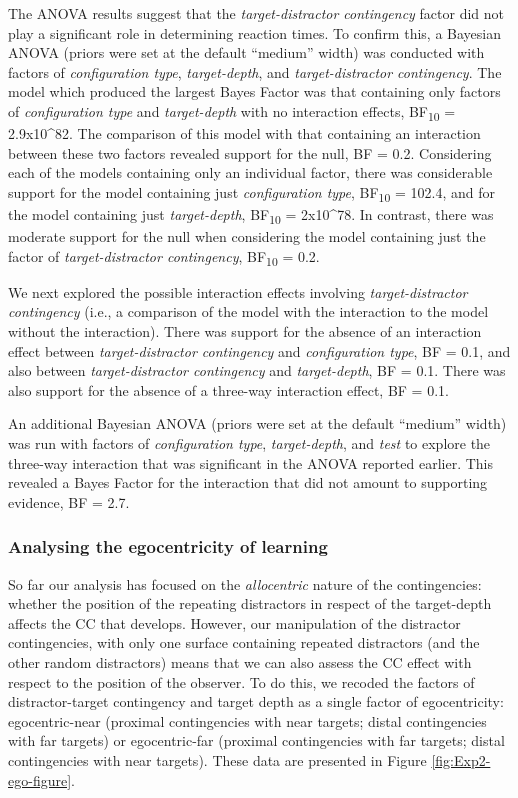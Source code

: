 \documentclass[
  man,floatsintext]{apa7}
\begin{document}
The ANOVA results suggest that the \emph{target-distractor contingency} factor did not play a significant role in determining reaction times. To confirm this, a Bayesian ANOVA (priors were set at the default ``medium'' width) was conducted with factors of \emph{configuration type}, \emph{target-depth}, and \emph{target-distractor contingency}. The model which produced the largest Bayes Factor was that containing only factors of \emph{configuration type} and \emph{target-depth} with no interaction effects, BF\textsubscript{10} = 2.9x10\^{}82. The comparison of this model with that containing an interaction between these two factors revealed support for the null, BF = 0.2. Considering each of the models containing only an individual factor, there was considerable support for the model containing just \emph{configuration type}, BF\textsubscript{10} = 102.4, and for the model containing just \emph{target-depth}, BF\textsubscript{10} = 2x10\^{}78. In contrast, there was moderate support for the null when considering the model containing just the factor of \emph{target-distractor contingency}, BF\textsubscript{10} = 0.2.

We next explored the possible interaction effects involving \emph{target-distractor contingency} (i.e., a comparison of the model with the interaction to the model without the interaction). There was support for the absence of an interaction effect between \emph{target-distractor contingency} and \emph{configuration type}, BF = 0.1, and also between \emph{target-distractor contingency} and \emph{target-depth}, BF = 0.1. There was also support for the absence of a three-way interaction effect, BF = 0.1.

An additional Bayesian ANOVA (priors were set at the default ``medium'' width) was run with factors of \emph{configuration type}, \emph{target-depth}, and \emph{test} to explore the three-way interaction that was significant in the ANOVA reported earlier. This revealed a Bayes Factor for the interaction that did not amount to supporting evidence, BF = 2.7.

\hypertarget{analysing-the-egocentricity-of-learning}{%
\subsubsection{Analysing the egocentricity of learning}\label{analysing-the-egocentricity-of-learning}}

So far our analysis has focused on the \emph{allocentric} nature of the contingencies: whether the position of the repeating distractors in respect of the target-depth affects the CC that develops. However, our manipulation of the distractor contingencies, with only one surface containing repeated distractors (and the other random distractors) means that we can also assess the CC effect with respect to the position of the observer. To do this, we recoded the factors of distractor-target contingency and target depth as a single factor of egocentricity: egocentric-near (proximal contingencies with near targets; distal contingencies with far targets) or egocentric-far (proximal contingencies with far targets; distal contingencies with near targets). These data are presented in Figure \ref{fig:Exp2-ego-figure}.
\end{document}
